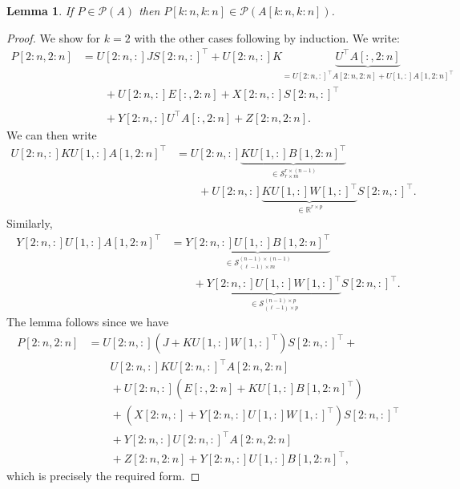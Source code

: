 \documentclass[a4paper,fleqn]{cas-sc}
\newtheorem{lemma}{Lemma}
\def\bbR{{\mathbb R}}
\def\calP{{\mathcal P}}
\def\calS{{\mathcal S}}
\begin{document}
\begin{lemma}\label{Lemma:Ppertub}
    If $P \in \calP(A)$ then $P[k\!:\!n,k\!:\!n] \in \calP(A[k\!:\!n,k\!:\!n])$.
\end{lemma}
\begin{proof}
    We show for $k=2$ with the other cases following by induction. We write:
\begin{align*}
    P[2\!:\!n,2\!:\!n] &= U[2\!:\!n,:] J S[2\!:\!n,:]^\top + 
    U[2\!:\!n,:] K \underbrace{U^\top A[:,2\!:\!n]}_{=U[2\!:\!n,:]^\top A[2\!:\!n,2\!:\!n] + U[1,:] A[1,2\!:\!n]^\top}\\
    &\qquad +
    U[2\!:\!n,:] E[:,2\!:\!n] + X[2\!:\!n,:] S[2\!:\!n,:]^\top \\
    \\
    &\qquad + Y[2\!:\!n,:]U^\top A[:,2\!:\!n] + Z[2\!:\!n,2\!:\!n].
\end{align*}
We can then write
\begin{align*}
U[2\!:\!n,:]K U[1,:] A[1,2\!:\!n]^\top &= U[2\!:\!n,:] \underbrace{K U[1,:] B[1,2\!:\!n]^\top}_{\in \calS_{r \times m}^{r \times (n-1)}} \\
&\qquad + U[2\!:\!n,:] \underbrace{K U[1,:]W[1,:]^\top}_{\in \bbR^{r \times p}} S[2\!:\!n,:]^\top.
\end{align*}
Similarly,
\begin{align*}
Y[2\!:\!n,:] U[1,:] A[1,2\!:\!n]^\top &= \underbrace{Y[2\!:\!n,:] U[1,:] B[1,2\!:\!n]^\top}_{\in \calS_{(\ell-1) \times m}^{(n-1) \times (n-1)}} \\
&\qquad +  \underbrace{Y[2\!:\!n,:] U[1,:]W[1,:]^\top}_{\in \calS_{(\ell-1) \times p}^{(n-1) \times p}} S[2\!:\!n,:]^\top.
\end{align*}
The lemma follows since we have
\begin{align*}
P[2\!:\!n,2\!:\!n] &= U[2\!:\!n,:] (J + K U[1,:] W[1,:]^\top) S[2\!:\!n,:]^\top + \\
&\qquad U[2\!:\!n,:] K U[2\!:\!n,:]^\top A[2\!:\!n,2\!:\!n] \\
&\qquad + U[2\!:\!n,:](E[:,2\!:\!n] + K U[1,:] B[1,2\!:\!n]^\top) \\
&\qquad + (X[2\!:\!n,:] + Y[2\!:\!n,:]U[1,:]W[1,:]^\top)S[2\!:\!n,:]^\top \\
&\qquad + Y[2\!:\!n,:]U[2\!:\!n,:]^\top A[2\!:\!n,2\!:\!n] \\
&\qquad + Z[2\!:\!n,2\!:\!n] + Y[2\!:\!n,:] U[1,:]B[1,2\!:\!n]^\top,
\end{align*}
which is precisely the required form.
\end{proof}
\end{document}
